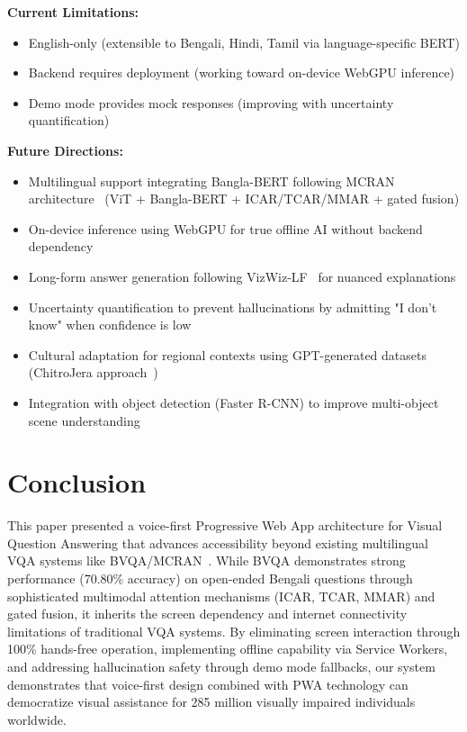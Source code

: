 \documentclass[conference]{IEEEtran}
\begin{document}
\textbf{Current Limitations:}
\begin{itemize}
    \item English-only (extensible to Bengali, Hindi, Tamil via language-specific BERT)
    \item Backend requires deployment (working toward on-device WebGPU inference)
    \item Demo mode provides mock responses (improving with uncertainty quantification)
\end{itemize}

\textbf{Future Directions:}
\begin{itemize}
    \item Multilingual support integrating Bangla-BERT following MCRAN architecture~\cite{bvqa_2025} (ViT + Bangla-BERT + ICAR/TCAR/MMAR + gated fusion)
    \item On-device inference using WebGPU for true offline AI without backend dependency
    \item Long-form answer generation following VizWiz-LF~\cite{vizwiz_lf_2024} for nuanced explanations
    \item Uncertainty quantification to prevent hallucinations by admitting "I don't know" when confidence is low
    \item Cultural adaptation for regional contexts using GPT-generated datasets (ChitroJera approach~\cite{chitrojera_2025})
    \item Integration with object detection (Faster R-CNN) to improve multi-object scene understanding
\end{itemize}

\section{Conclusion}

This paper presented a voice-first Progressive Web App architecture for Visual Question Answering that advances accessibility beyond existing multilingual VQA systems like BVQA/MCRAN~\cite{bvqa_2025}. While BVQA demonstrates strong performance (70.80\% accuracy) on open-ended Bengali questions through sophisticated multimodal attention mechanisms (ICAR, TCAR, MMAR) and gated fusion, it inherits the screen dependency and internet connectivity limitations of traditional VQA systems. By eliminating screen interaction through 100\% hands-free operation, implementing offline capability via Service Workers, and addressing hallucination safety through demo mode fallbacks, our system demonstrates that voice-first design combined with PWA technology can democratize visual assistance for 285 million visually impaired individuals worldwide.
\end{document}
